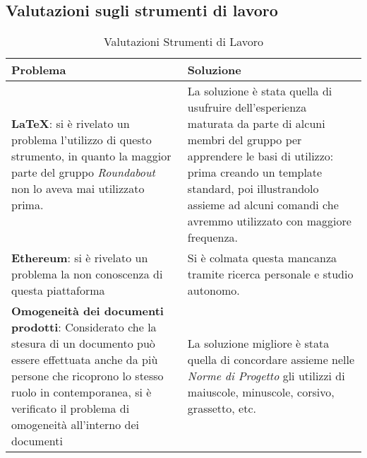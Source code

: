 \subsection{Valutazioni sugli strumenti di lavoro}
	\begin{longtable}{ 
			>{\centering}p{} 
			>{\centering\arraybackslash}p{} }
		
		\caption {Valutazioni Strumenti di Lavoro}		\\
		
		\textbf{\color{white}Problema} &
		\textbf{\color{white}Soluzione}
		\tabularnewline  
		\endhead
		
		\textbf{\LaTeX{}\ped{\textit{G}}}: si è rivelato un problema l'utilizzo di questo strumento, in quanto la maggior parte del gruppo \textit{Roundabout} non lo aveva mai utilizzato prima. & La soluzione è stata quella di usufruire dell'esperienza maturata da parte di alcuni membri del gruppo per apprendere le basi di utilizzo: prima creando un template\ped{\textit{G}} standard, poi illustrandolo assieme ad alcuni comandi che avremmo utilizzato con maggiore frequenza. \\
		
		\textbf{Ethereum\ped{\textit{G}}}: si è rivelato un problema la non conoscenza di questa piattaforma & Si è colmata questa mancanza tramite ricerca personale e studio autonomo. \\
		
		\textbf{Omogeneità dei documenti prodotti}: Considerato che la stesura di un documento può essere effettuata anche da più persone che ricoprono lo stesso ruolo in contemporanea, si è verificato il problema di omogeneità all'interno dei documenti & La soluzione migliore è stata quella di concordare assieme nelle \textit{Norme di Progetto} gli utilizzi di maiuscole, minuscole, corsivo, grassetto, etc. \\
		
	\end{longtable}

